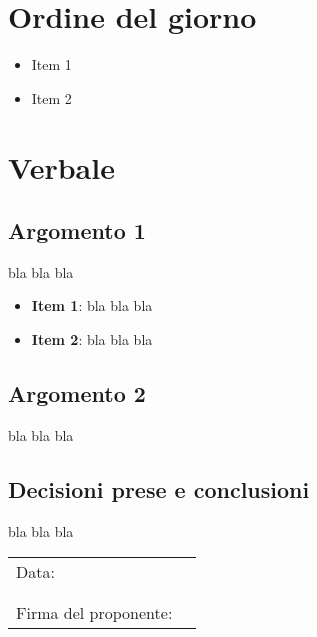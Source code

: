\documentclass[italian,12pt]{article}
\begin{document}
\section{Ordine del giorno}
\begin{itemize}
	\item Item 1
	\item Item 2
\end{itemize}

\newpage

\section{Verbale}

\subsection{Argomento 1}
bla bla bla
\begin{itemize}
	\item \textbf{Item 1}: bla bla bla
	\item \textbf{Item 2}: bla bla bla
\end{itemize}

\subsection{Argomento 2}
bla bla bla

\subsection{Decisioni prese e conclusioni}
bla bla bla


\newpage
\begin{table}[b]
	\begin{tabular}{@{}p{5cm}p{10cm}@{}}
		Data:  & \hrulefill \\
		       &            \\
		       &            \\
		Firma del proponente: & \hrulefill \\
	\end{tabular}
\end{table}
\end{document}
